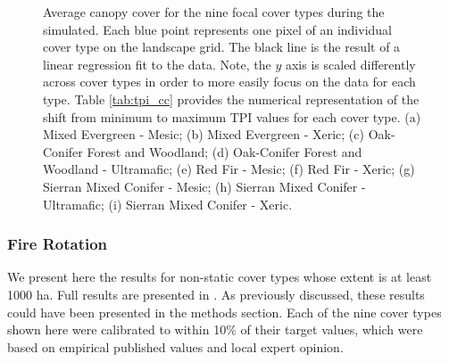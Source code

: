\begin{figure}[!htbp]
  \centering


  \caption{Average canopy cover for the nine focal cover types during the simulated. Each blue point represents one pixel of an individual cover type on the landscape grid. The black line is the result of a linear regression fit to the data. Note, the $y$ axis is scaled differently across cover types in order to more easily focus on the data for each type. Table \ref{tab:tpi_cc} provides the numerical representation of the shift from minimum to maximum TPI values for each cover type. (a) Mixed Evergreen - Mesic; (b) Mixed Evergreen - Xeric; (c) Oak-Conifer Forest and Woodland; (d) Oak-Conifer Forest and Woodland - Ultramafic; (e) Red Fir - Mesic; (f) Red Fir - Xeric; (g) Sierran Mixed Conifer - Mesic; (h) Sierran Mixed Conifer - Ultramafic; (i) Sierran Mixed Conifer - Xeric.}
  \label{fig:tpi_cc}
\end{figure}



\newpage
\subsubsection{Fire Rotation}
We present here the results for non-static cover types whose extent is at least 1000 ha. Full results are presented in . As previously discussed, these results could have been presented in the methods section. Each of the nine cover types shown here were calibrated to within 10\% of their target values, which were based on empirical published values and local expert opinion.

